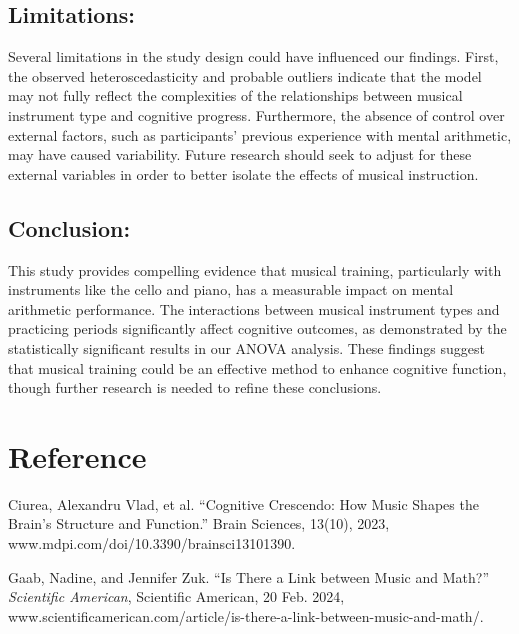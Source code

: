 \documentclass[11pt]{article}
\newcommand{\bibent}{\noindent\hangindent 20pt}
\begin{document}
\subsection*{Limitations:}
Several limitations in the study design could have influenced our findings. First, the observed heteroscedasticity and probable outliers indicate that the model may not fully reflect the complexities of the relationships between musical instrument type and cognitive progress. Furthermore, the absence of control over external factors, such as participants' previous experience with mental arithmetic, may have caused variability. Future research should seek to adjust for these external variables in order to better isolate the effects of musical instruction.


\subsection*{Conclusion:}
This study provides compelling evidence that musical training, particularly with instruments like the cello and piano, has a measurable impact on mental arithmetic performance. The interactions between musical instrument types and practicing periods significantly affect cognitive outcomes, as demonstrated by the statistically significant results in our ANOVA analysis. These findings suggest that musical training could be an effective method to enhance cognitive function, though further research is needed to refine these conclusions.

\newpage
\section{Reference}
\bibent
Ciurea, Alexandru Vlad, et al. “Cognitive Crescendo: How Music Shapes the Brain’s Structure and Function.” Brain Sciences, 13(10), 2023, www.mdpi.com/doi/10.3390/brainsci13101390.
\vspace{10pt}

\sloppy
\bibent 
Gaab, Nadine, and Jennifer Zuk. “Is There a Link between Music and Math?” \textit{Scientific American}, Scientific American, 20 Feb. 2024, www.scientificamerican.com/article/is-there-a-link-between-music-and-math/.
\vspace{10pt}
\end{document}
